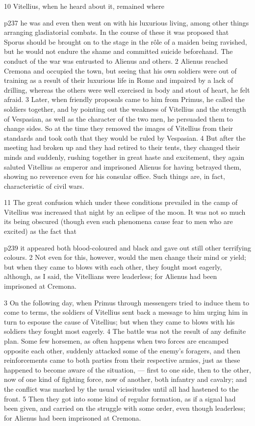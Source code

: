 10
Vitellius, when he heard about it, remained where

p237 he was and even then went on with his luxurious living, among other things arranging gladiatorial combats. In the course of these it was proposed that Sporus should be brought on to the stage in the rôle of a maiden being ravished, but he would not endure the shame and committed suicide beforehand. The conduct of the war was entrusted to Alienus and others. 2 Alienus reached Cremona and occupied the town, but seeing that his own soldiers were out of training as a result of their luxurious life in Rome and impaired by a lack of drilling, whereas the others were well exercised in body and stout of heart, he felt afraid. 3 Later, when friendly proposals came to him from Primus, he called the soldiers together, and by pointing out the weakness of Vitellius and the strength of Vespasian, as well as the character of the two men, he persuaded them to change sides. So at the time they removed the images of Vitellius from their standards and took oath that they would be ruled by Vespasian. 4 But after the meeting had broken up and they had retired to their tents, they changed their minds and suddenly, rushing together in great haste and excitement, they again saluted Vitellius as emperor and imprisoned Alienus for having betrayed them, showing no reverence even for his consular office. Such things are, in fact, characteristic of civil wars.

11
The great confusion which under these conditions prevailed in the camp of Vitellius was increased that night by an eclipse of the moon. It was not so much its being obscured (though even such phenomena cause fear to men who are excited) as the fact that

p239 it appeared both blood-coloured and black and gave out still other terrifying colours. 2 Not even for this, however, would the men change their mind or yield; but when they came to blows with each other, they fought most eagerly, although, as I said, the Vitellians were leaderless; for Alienus had been imprisoned at Cremona.

3
On the following day, when Primus through messengers tried to induce them to come to terms, the soldiers of Vitellius sent back a message to him urging him in turn to espouse the cause of Vitellius; but when they came to blows with his soldiers they fought most eagerly. 4 The battle was not the result of any definite plan. Some few horsemen, as often happens when two forces are encamped opposite each other, suddenly attacked some of the enemy's foragers, and then reinforcements came to both parties from their respective armies, just as these happened to become aware of the situation, \texthebrew{—} first to one side, then to the other, now of one kind of fighting force, now of another, both infantry and cavalry; and the conflict was marked by the usual vicissitudes until all had hastened to the front. 5 Then they got into some kind of regular formation, as if a signal had been given, and carried on the struggle with some order, even though leaderless; for Alienus had been imprisoned at Cremona.

